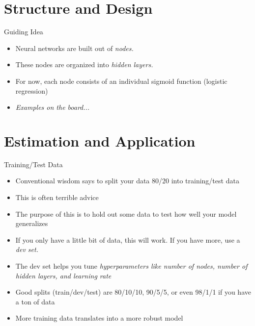 \documentclass{beamer}
\begin{document}
    \section{Structure and Design}    
    
        \begin{frame}{Guiding Idea}
            \begin{itemize}
                \item<2-> Neural networks are built out of \em nodes.\em
                \item<3-> These nodes are organized into \em hidden layers.\em
                \item<4-> For now, each node consists of an individual sigmoid function (logistic regression)
                \item<5-> \em Examples on the board... \em
            \end{itemize}
        \end{frame}
        
    \section{Estimation and Application}
    
        \begin{frame}{Training/Test Data}
            \begin{itemize}
                \item<2-> Conventional wisdom says to split your data 80/20 into training/test data
                \item<3-> This is often terrible advice
                \item<4-> The purpose of this is to hold out some data to test how well your model generalizes
                \item<5-> If you only have a little bit of data, this will work. If you have more, use a \em dev set.\em
                \item<6-> The dev set helps you tune \em hyperparameters \em like number of nodes, number of hidden layers, and learning rate
                \item<7-> Good splits (train/dev/test) are 80/10/10, 90/5/5, or even 98/1/1 if you have a ton of data
                \item<8-> More training data translates into a more robust model
            \end{itemize}
        \end{frame}
        
\end{document}
